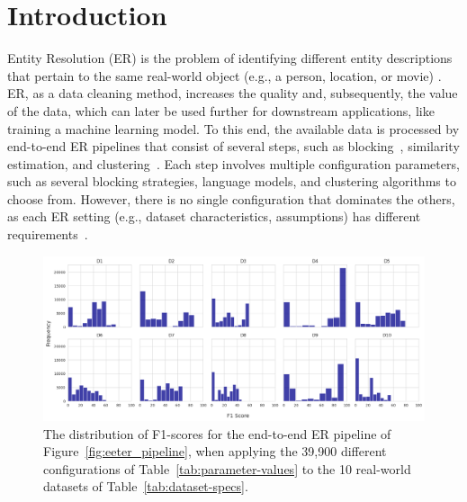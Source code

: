 \section{Introduction}\label{sec:introduction}
Entity Resolution (ER) is the problem of identifying different entity descriptions that pertain to the same real-world object (e.g., a person, location, or movie)
\cite{DBLP:books/daglib/0030287}. ER, as a data cleaning method, increases the quality and, subsequently, the value of the data, which can later be used further for downstream applications, like training a machine learning model. To this end, the available data is processed by end-to-end ER pipelines that consist of 
several steps, such as blocking~\cite{DBLP:journals/pvldb/Thirumuruganathan21}, similarity estimation, and clustering~\cite{DBLP:journals/pvldb/HassanzadehCML09,DBLP:journals/vldb/PapadakisETHC23}. Each step
involves multiple configuration parameters, such as 
several blocking strategies, language models, and clustering algorithms to choose from. However, there is no single configuration that dominates the others, as each ER setting (e.g., dataset characteristics, assumptions) has different requirements~\cite{DBLP:journals/pvldb/SunZHWCAL20,DBLP:journals/pvldb/KopckeTR10}. 

\begin{figure}[t]
    \centering
\includegraphics[width=0.97\linewidth]{Nikoletos-paper/figures/predictions/f1_score_distribution.png}
    \caption{The distribution of F1-scores for the end-to-end ER pipeline of Figure~\ref{fig:eeter_pipeline}, when applying the 39,900 different configurations of Table~\ref{tab:parameter-values} to the 10 real-world datasets of Table~\ref{tab:dataset-specs}.}
    \label{fig:f1_boxplot_all}
\end{figure}

